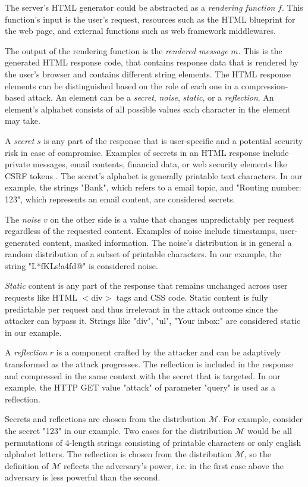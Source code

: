 \documentclass[conference, letterpaper, 10pt]{IEEEtran}
\begin{document}
The server's HTML generator could be abstracted as a \textit{rendering
function} $f$. This function's input is the user's request, resources such as the
HTML blueprint for the web page, and external functions such as web framework
middlewares.

The output of the rendering function is the \textit{rendered message} $m$. This
is the generated HTML response code, that contains response data that is
rendered by the user's browser and contains different string elements. The HTML
response elements can be distinguished based on the role of each one in a
compression-based attack. An element can be a \textit{secret}, \textit{noise},
\textit{static}, or a \textit{reflection}. An element's alphabet consists of all
possible values each character in the element may take.

A \textit{secret} $s$ is any part of the response that is user-specific and a
potential security risk in case of compromise. Examples of secrets in an HTML
response include private messages, email contents, financial data, or web
security elements like CSRF tokens \cite{c16}. The secret's alphabet is generally printable
text characters. In our example, the strings "Bank", which refers to a email
topic, and "Routing number: 123", which represents an email content, are
considered secrets.

The \textit{noise} $v$ on the other side is a value that changes unpredictably per
request regardless of the requested content. Examples of noise include
timestamps, user-generated content, masked information. The noise's distribution
is in general a random distribution of a subset of printable characters. In our
example, the string "L*fKLs!a4fd@" is considered noise.

\textit{Static} content is any part of the response that remains unchanged
across user requests like HTML $<$div$>$ tags and CSS code. Static content is fully
predictable per request and thus irrelevant in the attack outcome since the
attacker can bypass it. Strings like "div", "ul", "Your inbox:" are considered
static in our example.

A \textit{reflection} $r$ is a component crafted by the attacker and can be
adaptively transformed as the attack progresses. The reflection is included in
the response and compressed in the same context with the secret that is
targeted. In our example, the HTTP GET value "attack" of parameter "query" is used as
a reflection.

Secrets and reflections are chosen from the distribution $\mathcal{M}$. For
example, consider the secret "123" in our example. Two cases for the
distribution $\mathcal{M}$ would be all permutations of 4-length strings
consisting of printable characters or only english alphabet letters. The
reflection is chosen from the distribution $\mathcal{M}$, so the definition of
$\mathcal{M}$ reflects the adversary's power, i.e. in the first case above the
adversary is less powerful than the second.
\end{document}
